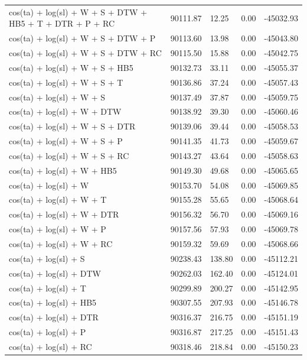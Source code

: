 \documentclass[abstract=on,10pt,a4paper,bibliography=totocnumbered]{scrartcl}
\begin{document}
\begin{table}[h]
\begin{center}
{\begin{tabular}{lllll}
        cos(ta) + log(sl) + W + S + DTW + HB5 + T + DTR + P + RC & 90111.87 & 12.25 & 0.00 & -45032.93 \\
        cos(ta) + log(sl) + W + S + DTW + P & 90113.60 & 13.98 & 0.00 & -45043.80 \\
        cos(ta) + log(sl) + W + S + DTW + RC & 90115.50 & 15.88 & 0.00 & -45042.75 \\
        cos(ta) + log(sl) + W + S + HB5 & 90132.73 & 33.11 & 0.00 & -45055.37 \\
        cos(ta) + log(sl) + W + S + T & 90136.86 & 37.24 & 0.00 & -45057.43 \\
        cos(ta) + log(sl) + W + S & 90137.49 & 37.87 & 0.00 & -45059.75 \\
        cos(ta) + log(sl) + W + DTW & 90138.92 & 39.30 & 0.00 & -45060.46 \\
        cos(ta) + log(sl) + W + S + DTR & 90139.06 & 39.44 & 0.00 & -45058.53 \\
        cos(ta) + log(sl) + W + S + P & 90141.35 & 41.73 & 0.00 & -45059.67 \\
        cos(ta) + log(sl) + W + S + RC & 90143.27 & 43.64 & 0.00 & -45058.63 \\
        cos(ta) + log(sl) + W + HB5 & 90149.30 & 49.68 & 0.00 & -45065.65 \\
        cos(ta) + log(sl) + W & 90153.70 & 54.08 & 0.00 & -45069.85 \\
        cos(ta) + log(sl) + W + T & 90155.28 & 55.65 & 0.00 & -45068.64 \\
        cos(ta) + log(sl) + W + DTR & 90156.32 & 56.70 & 0.00 & -45069.16 \\
        cos(ta) + log(sl) + W + P & 90157.56 & 57.93 & 0.00 & -45069.78 \\
        cos(ta) + log(sl) + W + RC & 90159.32 & 59.69 & 0.00 & -45068.66 \\
        cos(ta) + log(sl) + S & 90238.43 & 138.80 & 0.00 & -45112.21 \\
        cos(ta) + log(sl) + DTW & 90262.03 & 162.40 & 0.00 & -45124.01 \\
        cos(ta) + log(sl) + T & 90299.89 & 200.27 & 0.00 & -45142.95 \\
        cos(ta) + log(sl) + HB5 & 90307.55 & 207.93 & 0.00 & -45146.78 \\
        cos(ta) + log(sl) + DTR & 90316.37 & 216.75 & 0.00 & -45151.19 \\
        cos(ta) + log(sl) + P & 90316.87 & 217.25 & 0.00 & -45151.43 \\
        cos(ta) + log(sl) + RC & 90318.46 & 218.84 & 0.00 & -45150.23 \\
       \bottomrule
     \end{tabular}
    }
  \end{center}
\end{table}
\end{document}
